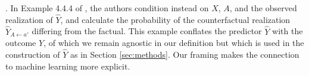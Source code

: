 .  In
Example 4.4.4 of \cite{pearl:16}, the authors condition instead on
$X$, $A$, and the observed realization of $\hat Y$, and calculate the
probability of the counterfactual realization $\hat Y_{A \leftarrow
  a'}$ differing from the factual.
This example conflates the predictor $\hat Y$ with the outcome $Y$, of
which we remain agnostic in our definition but which is used in the
construction of $\hat Y$ as in Section \ref{sec:methods}. Our framing
makes the connection to machine learning more explicit.

